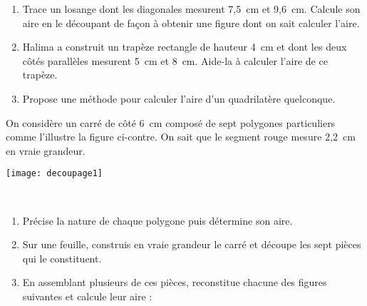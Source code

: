 \begin{activite}
\end{activite}


\newpage

\begin{activite}

\begin{enumerate}
\item Trace un losange dont les diagonales mesurent 7,5 cm et 9,6 cm. Calcule son aire en le découpant de façon à obtenir une figure dont on sait calculer l'aire.

\item Halima a construit un trapèze rectangle de hauteur 4 cm et dont les deux côtés parallèles mesurent 5 cm et 8 cm. Aide-la à calculer l’aire de ce trapèze.

\item Propose une méthode pour calculer l'aire d'un quadrilatère quelconque.
\end{enumerate}

\end{activite}


\begin{activite}[Découpages]

\begin{minipage}[c]{0.76\linewidth}
On considère un carré de côté 6 cm composé de sept polygones particuliers comme l'illustre la figure ci-contre. On sait que le segment rouge mesure 2,2 cm en vraie grandeur.
 \end{minipage} \hfill%
 \begin{minipage}[c]{0.2\linewidth}
  \texttt{[image: decoupage1]}
  \end{minipage} \\

\begin{enumerate}
\item Précise la nature de chaque polygone puis détermine son aire.

\item Sur une feuille, construis en vraie grandeur le carré et découpe les sept pièces qui le constituent.

\item En assemblant plusieurs de ces pièces, reconstitue chacune des figures suivantes et calcule leur aire :

\end{enumerate}
\end{activite}




